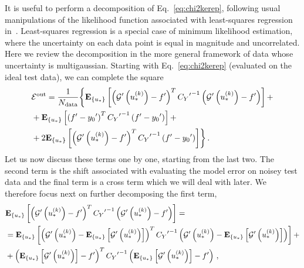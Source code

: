 It is useful to perform a decomposition of Eq.~\ref{eq:chi2kerep}, following
usual manipulations of the likelihood function associated with least-squares
regression in~\cite{mlforphysics}. Least-squares regression is a special case of
minimum likelihood estimation, where the uncertainty on each data point is equal
in magnitude and uncorrelated. Here we review the decomposition in the more
general framework of data whose uncertainty is multigaussian. Starting with
Eq.~\ref{eq:chi2kerep} (evaluated on the ideal test data), we can complete the
square
\begin{equation}
    \begin{split}
    \label{eq:EoutDecomposition}
        &\mathcal{E}^{\rm out} = \frac{1}{N_{\rm data}} \biggl\{ \mathbf{E}_{\{ u_* \}} \left[ 
            \left( {{\mathcal{G}}^{\prime}}\left(u_*^{(k)}\right) - {{f}^{\prime}} \right)^T
            {{C_{Y}}^{\prime}}^{-1}
            \left( {{\mathcal{G}}^{\prime}}\left(u_*^{(k)}\right) - {{f}^{\prime}} \right)
         \right] + \\
        &+ \mathbf{E}_{\{ u_* \}} \left[ 
            \left( {{f}^{\prime}} - {{y_0}^{\prime}} \right)^T
            {{C_{Y}}^{\prime}}^{-1}
            \left( {{f}^{\prime}} - {{y_0}^{\prime}} \right)
         \right]+ \\
        &+ 2 \mathbf{E}_{\{ u_* \}} \left[ 
            \left( {{\mathcal{G}}^{\prime}}\left(u_*^{(k)}\right) - {{f}^{\prime}} \right)^T
            {{C_{Y}}^{\prime}}^{-1}
            \left({{f}^{\prime}} - {{y_0}^{\prime}} \right)
         \right]\biggr\}\, .
    \end{split}
\end{equation}
Let us now discuss these terms one by one, starting from the last two. The
second term is the shift associated with evaluating the model error on noisey
test data and the final term is a cross term which we will deal with later. We
therefore focus next on further decomposing the first term,
\begin{equation}
    \begin{split}
        &\mathbf{E}_{\{ u_* \}} \left[ 
            \left( {{\mathcal{G}}^{\prime}}\left(u_*^{(k)}\right) - {{f}^{\prime}} \right)^T
            {{C_{Y}}^{\prime}}^{-1}
            \left( {{\mathcal{G}}^{\prime}}\left(u_*^{(k)}\right) - {{f}^{\prime}} \right)
         \right] = \\
        &= \mathbf{E}_{\{ u_* \}} \left[ 
            \left( {{\mathcal{G}}^{\prime}}\left(u_*^{(k)}\right) - 
            \mathbf{E}_{\{ u_* \}} \left[ {{\mathcal{G}}^{\prime}}\left(u_*^{(k)}\right) \right] \right)^T
            {{C_{Y}}^{\prime}}^{-1}
            \left( {{\mathcal{G}}^{\prime}}\left(u_*^{(k)}\right) - 
            \mathbf{E}_{\{ u_* \}} \left[ {{\mathcal{G}}^{\prime}}\left(u_*^{(k)}\right) \right] \right)
         \right] + \\
        &+ \left( \mathbf{E}_{\{ u_* \}} \left[ {{\mathcal{G}}^{\prime}}\left(u_*^{(k)}\right) \right] - {{f}^{\prime}} \right)^T
        {{C_{Y}}^{\prime}}^{-1}
        \left( \mathbf{E}_{\{ u_* \}} \left[ {{\mathcal{G}}^{\prime}}\left(u_*^{(k)}\right) \right] - {{f}^{\prime}} \right)\, ,
    \end{split}
\end{equation}
